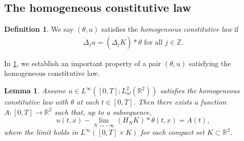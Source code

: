 \documentclass[11pt,reqno,xcolor=svgnames]{amsart}
\def\R{{\mathbb R}}
\def\Z{{\mathbb Z}}
\theoremstyle{plain}
\newtheorem{lemma}[theorem]{Lemma}
\theoremstyle{definition}
\newtheorem{definition}[theorem]{Definition}
\theoremstyle{plain}
\theoremstyle{remark}
\newcommand{\Del}{\dot{\Delta}}
\begin{document}
\noindent\subsection{The homogeneous constitutive law}
\begin{definition}
We say $(\theta, u)$ satisfies the \textit{homogeneous constitutive law} if
\begin{align*}
	\Del_j u
		= (\Del_j K) * \theta
		\text{ for all } j \in \Z.
\end{align*}
\end{definition}
In \cref{SNulimit}, we establish an important property of a pair $(\theta, u)$ satisfying the homogeneous constitutive law.

\begin{lemma}\label{SNulimit}
Assume $u\in L^{\infty}([0,T]; L^2_{ul}(\R^2))$ satisfies the homogeneous constitutive law with $\theta$ at each $t\in [0,T]$.  Then there exists a function $A: [0,T]\rightarrow\R^2$ such that, up to a subsequence,
$$ u(t,x) - \lim_{N\rightarrow -\infty} (H_N K) \ast \theta(t,x)= A(t),$$
where the limit holds in $L^{\infty}([0,T] \times K)$ for each compact set $K\subset \R^2$.
\end{lemma}
\end{document}
